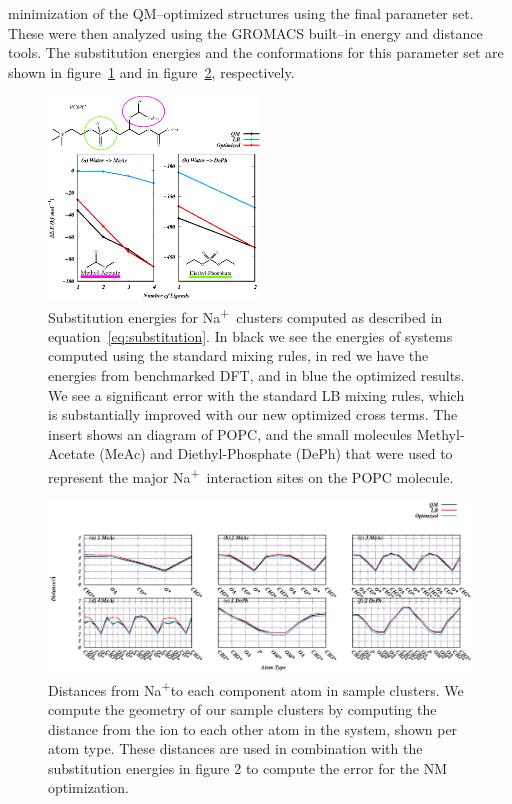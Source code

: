 \documentclass[12pt,openany,final]{book}
\newcommand{\na}{Na\textsuperscript{+}}
\begin{document}
minimization of the QM--optimized structures using the final parameter set. 
These were then analyzed using the GROMACS built--in energy and distance tools. 
The substitution energies and the conformations for
this parameter set are shown in figure~\ref{fig:energies:ch1} 
and in figure~\ref{fig:distances:ch1}, respectively. 
\begin{figure}[h!]
    \caption[Substitution energies for \na~clusters computed as described
    in equation~\ref{eq:substitution}]{
Substitution energies for \na~clusters computed as described
in equation~\ref{eq:substitution}. 
In black we see the energies of systems computed using the standard 
mixing rules, in red we have the energies from benchmarked DFT, 
and in blue the optimized results. 
We see a significant
error with the standard LB mixing rules, which is substantially improved with our new optimized cross terms. 
The insert shows an diagram of POPC, and
the small molecules Methyl-Acetate (MeAc) and Diethyl-Phosphate (DePh) 
that were used to represent the major \na~interaction sites on the POPC molecule.}
    \label{fig:energies:ch1}
    \includegraphics[width=0.5\textwidth,trim=0cm 0 0 0]{figure_1_ch1.eps}
\end{figure}
\begin{figure}[h!]
    \centering
    \caption[Distances from \na to each component atom in sample clusters.]{Distances from \na to each component atom in sample clusters. We compute the geometry of our sample clusters by computing the distance from
    the ion to each other atom in the system, shown per atom type.
    These distances are used in combination with the substitution energies in figure 2 to compute the
error for the NM optimization.}
    \label{fig:distances:ch1}
    \includegraphics[width=\textwidth]{figure_s1_ch1.eps}
\end{figure}
\end{document}
